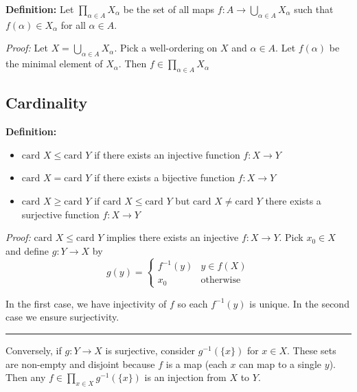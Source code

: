\documentclass[12pt]{article}
\newcommand{\card}{\text{card }}
\renewcommand{\div}{\vspace*{10pt}\hrule\vspace*{10pt}}
\newenvironment*{tbox}[2][gray]{
    \begin{tcolorbox}[
        parbox=false,
        colback=#1!5!white,
        colframe=#1!75!black,
        breakable,
        title={#2}
    ]}
    {\end{tcolorbox}}
\begin{document}
    \textbf{Definition:} Let $\prod_{\alpha \in A} X_{\alpha}$ be the set of all maps $f: A \to \bigcup_{\alpha \in A} X_{\alpha}$ such that $f(\alpha) \in X_{\alpha}$ for all $\alpha \in A$.

    \begin{tbox}{\textbf{Axiom of Choice:} If $\{X_\alpha\}_{\alpha \in A}$ is a nonempty collection of nonempty sets, $\prod_{\alpha \in A} X_{\alpha}$ is nonempty, i.e. there exists at least one choice function $f$ }
        \emph{Proof:} Let $X = \bigcup_{\alpha \in A} X_{\alpha}$. Pick a well-ordering on $X$ and $\alpha \in A$. Let $f(\alpha)$ be the minimal element of $X_{\alpha}$. Then $f \in \prod_{\alpha \in A} X_{\alpha}$ 
    \end{tbox}

    \subsection*{Cardinality} 
        \textbf{Definition:} 
        \begin{itemize}
            \item $\card X \leq \card Y$ if there exists an injective function $f: X \to Y$
            \item $\card X = \card Y$ if there exists a bijective function $f: X \to Y$
            \item $\card X \geq \card Y$ if $\card X \leq \card Y$ but $\card X \neq \card Y$ there exists a surjective function $f: X \to Y$
        \end{itemize}

        \begin{tbox}{\textbf{Property:} $\card X \leq \card Y$ iff $\card Y \geq \card X$}
            \emph{Proof:} $\card X \leq \card Y$ implies there exists an injective $f: X \to Y$. Pick $x_0 \in X$ and define $g: Y \to X$ by 
            \[g(y) = \begin{cases}
                f^{-1}(y) & y \in f(X)\\
                x_0 & \text{otherwise}
            \end{cases}\]
            
            In the first case, we have injectivity of $f$ so each $f^{-1}(y)$ is unique. In the second case we ensure surjectivity. 

            \div 

            Conversely, if $g: Y \to X$ is surjective, consider $g^{-1}(\{x\})$ for $x \in X$. These sets are non-empty and disjoint because $f$ is a map (each $x$ can map to a single $y$). Then any $f \in \prod_{x \in X} g^{-1}(\{x\})$ is an injection from $X$ to $Y$.
        \end{tbox}
\end{document}
